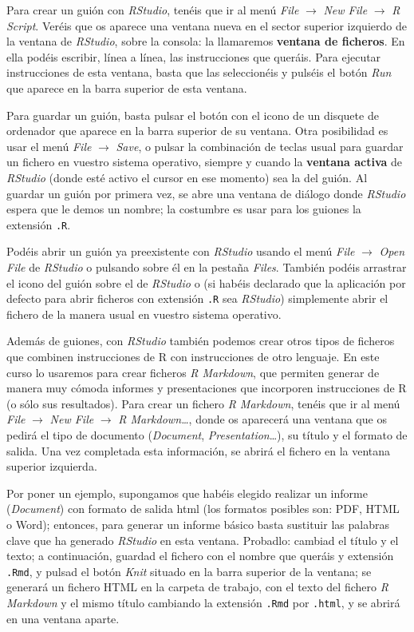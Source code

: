 \documentclass[
]{book}
\theoremstyle{definition}
\theoremstyle{definition}
\theoremstyle{definition}
\theoremstyle{remark}
\begin{document}
Para crear un guión con \emph{RStudio}, tenéis que ir al menú \emph{File} \(\rightarrow\) \emph{New File} \(\rightarrow\) \emph{R Script}. Veréis que os aparece una ventana nueva en el sector superior izquierdo de la ventana de \emph{RStudio}, sobre la consola: la llamaremos \textbf{ventana de ficheros}. En ella podéis escribir, línea a línea, las instrucciones que queráis. Para ejecutar instrucciones de esta ventana, basta que las seleccionéis y pulséis el botón \emph{Run} que aparece en la barra superior de esta ventana.

Para guardar un guión, basta pulsar el botón con el icono de un disquete de ordenador que aparece en la barra superior de su ventana. Otra posibilidad es usar el menú \emph{File} \(\rightarrow\) \emph{Save}, o pulsar la combinación de teclas usual para guardar un fichero en vuestro sistema operativo, siempre y cuando la \textbf{ventana activa} de \emph{RStudio} (donde esté activo el cursor en ese momento) sea la del guión. Al guardar un guión por primera vez, se abre una ventana de diálogo donde \emph{RStudio} espera que le demos un nombre; la costumbre es usar para los guiones la extensión \texttt{.R}.

Podéis abrir un guión ya preexistente con \emph{RStudio} usando el menú \emph{File} \(\rightarrow\) \emph{Open File} de \emph{RStudio} o pulsando sobre él en la pestaña \emph{Files}. También podéis arrastrar el icono del guión sobre el de \emph{RStudio} o (si habéis declarado que la aplicación por defecto para abrir ficheros con extensión \texttt{.R} sea \emph{RStudio}) simplemente abrir el fichero de la manera usual en vuestro sistema operativo.

Además de guiones, con \emph{RStudio} también podemos crear otros tipos de ficheros que combinen instrucciones de R con instrucciones de otro lenguaje. En este curso lo usaremos para crear ficheros \emph{R Markdown}, que permiten generar de manera muy cómoda informes y presentaciones que incorporen instrucciones de R (o sólo sus resultados). Para crear un fichero \emph{R Markdown}, tenéis que ir al menú \emph{File} \(\rightarrow\) \emph{New File} \(\rightarrow\) \emph{R Markdown\ldots{}}, donde os aparecerá una ventana que os pedirá el tipo de documento (\emph{Document}, \emph{Presentation}\ldots), su título y el formato de salida. Una vez completada esta información, se abrirá el fichero en la ventana superior izquierda.

Por poner un ejemplo, supongamos que habéis elegido realizar un informe (\emph{Document}) con formato de salida html (los formatos posibles son: PDF, HTML o Word); entonces, para generar un informe básico basta sustituir las palabras clave que ha generado \emph{RStudio} en esta ventana. Probadlo: cambiad el título y el texto; a continuación, guardad el fichero con el nombre que queráis y extensión \texttt{.Rmd}, y pulsad el botón \emph{Knit} situado en la barra superior de la ventana; se generará un fichero HTML en la carpeta de trabajo, con el texto del fichero \emph{R Markdown} y el mismo título cambiando la extensión \texttt{.Rmd} por \texttt{.html}, y se abrirá en una ventana aparte.
\end{document}
